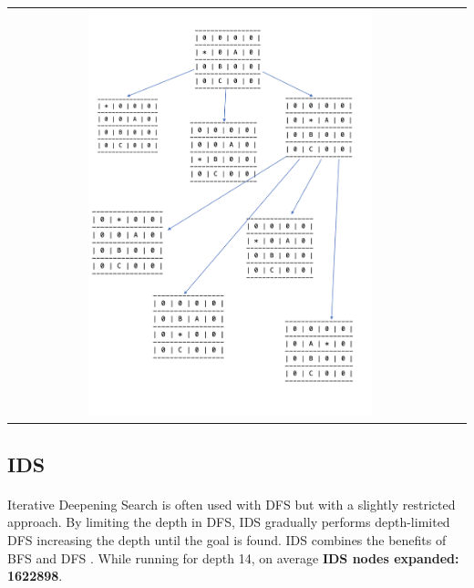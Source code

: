 \documentclass[10pt]{article}
\begin{document}
  \begin{center}
    \begin{tabular}{cc}
    \includegraphics[width=0.65\textwidth]{images/dfs.png} \\
      \end{tabular}
    \end{center}

  \subsection{IDS}
  \paragraph{} \indent
  Iterative Deepening Search is often used with DFS but with a slightly restricted approach. By limiting the depth in DFS, IDS gradually performs depth-limited DFS increasing the depth until the goal is found. IDS combines the benefits of BFS and DFS \cite{aim}.
  While running for depth 14, on average \textbf{IDS nodes expanded: 1622898}.
\end{document}

